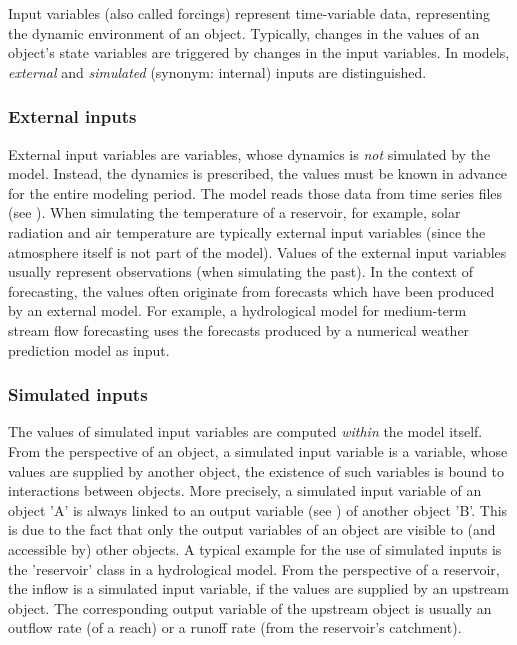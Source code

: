 Input variables (also called forcings) represent time-variable data, representing the dynamic environment of an object. Typically, changes in the values of an object's state variables are triggered by changes in the input variables. In  models, \emph{external} and \emph{simulated} (synonym: internal) inputs are distinguished.

\subsubsection*{External inputs} \label{sec:concept-classFeatures-inputsExt}

External input variables are variables, whose dynamics is \emph{not} simulated by the model. Instead, the dynamics is prescribed, \ie{} the values must be known in advance for the entire modeling period. The model reads those data from time series files (see ). When simulating the temperature of a reservoir, for example, solar radiation and air temperature are typically external input variables (since the atmosphere itself is not part of the model). Values of the external input variables usually represent observations (when simulating the past). In the context of forecasting, the values often originate from forecasts which have been produced by an external model. For example, a hydrological model for medium-term stream flow forecasting uses the forecasts produced by a numerical weather prediction model as input.

\subsubsection*{Simulated inputs} \label{sec:concept-classFeatures-inputsSim}

The values of simulated input variables are computed \emph{within} the model itself. From the perspective of an object, a simulated input variable is a variable, whose values are supplied by another object, \ie{} the existence of such variables is bound to interactions between objects. More precisely, a simulated input variable of an object 'A' is always linked to an output variable (see ) of another object 'B'. This is due to the fact that only the output variables of an object are visible to (and accessible by) other objects. A typical example for the use of simulated inputs is the 'reservoir' class in a hydrological model. From the perspective of a reservoir, the inflow is a simulated input variable, if the values are supplied by an upstream object. The corresponding output variable of the upstream object is usually an outflow rate (of a reach) or a runoff rate (from the reservoir's catchment).

